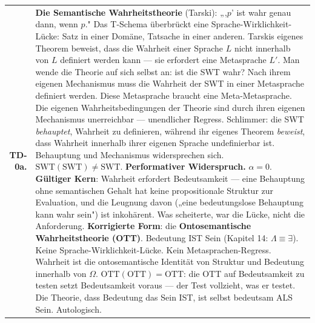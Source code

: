 \documentclass[10pt, openany, oneside]{book}
\renewcommand{\footnotesize}{\fontsize{8.5}{11}\selectfont}
\begin{document}
{\footnotesize
\noindent\begin{tabular}{r p{}}
\textbf{TD-0a.} & \textbf{Die Semantische Wahrheitstheorie} (Tarski): „‚$p$' ist wahr genau dann, wenn $p$." Das T-Schema überbrückt eine Sprache-Wirklichkeit-Lücke: Satz in einer Domäne, Tatsache in einer anderen. Tarskis eigenes Theorem beweist, dass die Wahrheit einer Sprache $L$ nicht innerhalb von $L$ definiert werden kann --- sie erfordert eine Metasprache $L'$. Man wende die Theorie auf sich selbst an: ist die SWT wahr? Nach ihrem eigenen Mechanismus muss die Wahrheit der SWT in einer Metasprache definiert werden. Diese Metasprache braucht eine Meta-Metasprache. Die eigenen Wahrheitsbedingungen der Theorie sind durch ihren eigenen Mechanismus unerreichbar --- unendlicher Regress. Schlimmer: die SWT \textit{behauptet}, Wahrheit zu definieren, während ihr eigenes Theorem \textit{beweist}, dass Wahrheit innerhalb ihrer eigenen Sprache undefinierbar ist. Behauptung und Mechanismus widersprechen sich. $\text{SWT}(\text{SWT}) \neq \text{SWT}$. \textbf{Performativer Widerspruch.} $\alpha = 0$. \textbf{Gültiger Kern}: Wahrheit erfordert Bedeutsamkeit --- eine Behauptung ohne semantischen Gehalt hat keine propositionale Struktur zur Evaluation, und die Leugnung davon („eine bedeutungslose Behauptung kann wahr sein") ist inkohärent. Was scheiterte, war die Lücke, nicht die Anforderung. \textbf{Korrigierte Form}: die \textbf{Ontosemantische Wahrheitstheorie (OTT)}. Bedeutung IST Sein (Kapitel 14: $\Lambda \equiv \exists$). Keine Sprache-Wirklichkeit-Lücke. Kein Metasprachen-Regress. Wahrheit ist die ontosemantische Identität von Struktur und Bedeutung innerhalb von $\Omega$. $\text{OTT}(\text{OTT}) = \text{OTT}$: die OTT auf Bedeutsamkeit zu testen setzt Bedeutsamkeit voraus --- der Test vollzieht, was er testet. Die Theorie, dass Bedeutung das Sein IST, ist selbst bedeutsam ALS Sein. Autologisch. \\[0.5em]

\end{tabular}}
\end{document}
